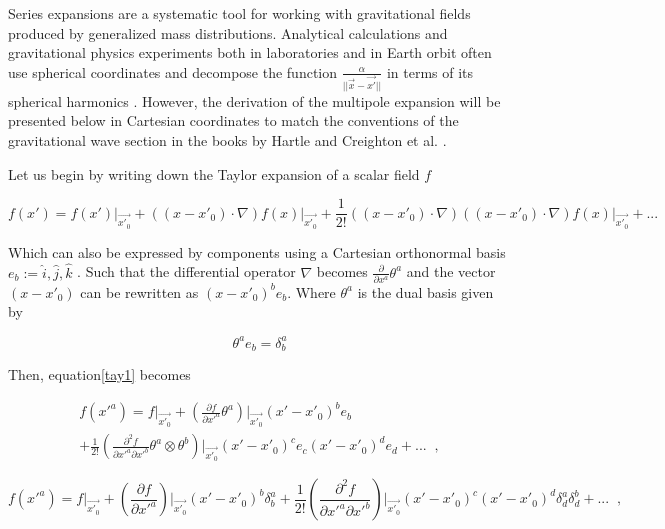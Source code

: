 Series expansions are a systematic tool for working with gravitational fields produced by generalized mass distributions. Analytical calculations and gravitational physics experiments both in laboratories and in Earth orbit often use spherical coordinates and decompose the function $\frac{\alpha}{||\vec{x}-\vec{x'}||}$ in terms of its spherical harmonics \cite{Muller,kaula1966theory,Stirling:2017ybn}. However, the derivation of the multipole expansion will be presented below in Cartesian coordinates to match the conventions of the gravitational wave section in the books by Hartle \cite{Hartle:2021pel} and Creighton et al. \cite{Creighton:2011zz}.

Let us begin by writing down the Taylor expansion of a scalar field $f$


\begin{equation}\label{tay1}
f(x') = f(x')\Biggr|_{\vec{x'_0}} + ((x-x'_0)\cdot \nabla) f(x)\Biggr|_{\vec{x'_0}} + \frac{1}{2!} ((x-x'_0)\cdot \nabla)((x-x'_0)\cdot \nabla) f(x)\Biggr|_{\vec{x'_0}} + ...
\end{equation}

Which can also be expressed by components using a Cartesian orthonormal basis $e_b:= {\hat{i}, \hat{j},\hat{k}}$ . Such that the differential operator $\nabla$ becomes $\frac{\partial}{\partial x^a} \theta^a$ and the vector $(x-x'_0)$ can be rewritten as $(x - x'_0)^b e_b$. Where $\theta^a$ is the dual basis given by 

$$\theta^a e_b= \delta^a_b$$

Then, equation\ref{tay1} becomes 

\begin{multline}
f(x'^a) = f\Biggr|_{\vec{x'_0}} + \left( \frac{\partial f}{\partial x'^a} \theta^a \right)\Biggr|_{\vec{x'_0}} (x' - x'_0)^b e_b \\ + \frac{1}{2!} \left( \frac{\partial^2 f}{\partial x'^a \partial x'^b} \theta^a \otimes \theta^b \right)\Biggr|_{\vec{x'_0}} (x' - x'_0)^c e_c (x' - x'_0)^d e_d + ...\;\; ,
\end{multline}

\begin{equation}\label{tay.exp}
f(x'^a) = f\Biggr|_{\vec{x'_0}} + \left( \frac{\partial f}{\partial x'^a} \right)\Biggr|_{\vec{x'_0}} (x' - x'_0)^b \delta^a_b + \frac{1}{2!} \left( \frac{\partial^2 f}{\partial x'^a \partial x'^b}  \right)\Biggr|_{\vec{x'_0}} (x' - x'_0)^c  (x' - x'_0)^d \delta^a_d \delta^b_d +   ... \;\; ,
\end{equation}

